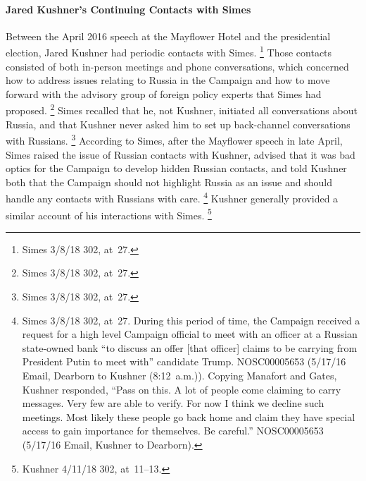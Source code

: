 \paragraph{Jared Kushner's Continuing Contacts with Simes}

Between the April 2016 speech at the Mayflower Hotel and the presidential election, Jared Kushner had periodic contacts with Simes.%
\footnote{Simes 3/8/18 302, at~27.}
Those contacts consisted of both in-person meetings and phone conversations, which concerned how to address issues relating to Russia in the Campaign and how to move forward with the advisory group of foreign policy experts that Simes had proposed.%
\footnote{Simes 3/8/18 302, at~27.}
Simes recalled that he, not Kushner, initiated all conversations about Russia, and that Kushner never asked him to set up back-channel conversations with Russians.%
\footnote{Simes 3/8/18 302, at~27.}
According to Simes, after the Mayflower speech in late April, Simes raised the issue of Russian contacts with Kushner, advised that it was bad optics for the Campaign to develop hidden Russian contacts, and told Kushner both that the Campaign should not highlight Russia as an issue and should handle any contacts with Russians with care.%
\footnote{Simes 3/8/18 302, at~27.
During this period of time, the Campaign received a request for a high level Campaign official to meet with an officer at a Russian state-owned bank ``to discuss an offer [that officer] claims to be carrying from President Putin to meet with'' candidate Trump.
NOSC00005653 (5/17/16 Email, Dearborn to Kushner (8:12~a.m.)).
Copying Manafort and Gates, Kushner responded, ``Pass on this.
A lot of people come claiming to carry messages.
Very few are able to verify.
For now I think we decline such meetings.
Most likely these people go back home and claim they have special access to gain importance for themselves.
Be careful.''
NOSC00005653 (5/17/16 Email, Kushner to Dearborn).}
Kushner generally provided a similar account of his interactions with Simes.%
\footnote{Kushner 4/11/18 302, at~11--13.}


